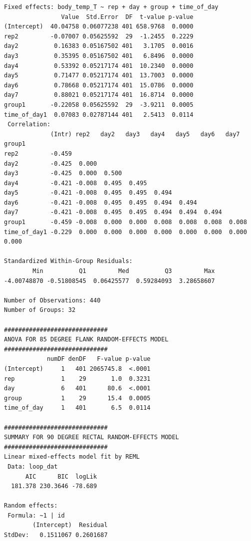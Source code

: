 \documentclass[a4paper, 10pt, titlepage]{article}
\begin{document}
\begin{lstlisting}[basicstyle = \footnotesize \ttfamily]
Fixed effects: body_temp_T ~ rep + day + group + time_of_day 
                Value  Std.Error  DF  t-value p-value
(Intercept)  40.04758 0.06077238 401 658.9768  0.0000
rep2         -0.07007 0.05625592  29  -1.2455  0.2229
day2          0.16383 0.05167502 401   3.1705  0.0016
day3          0.35395 0.05167502 401   6.8496  0.0000
day4          0.53392 0.05217174 401  10.2340  0.0000
day5          0.71477 0.05217174 401  13.7003  0.0000
day6          0.78668 0.05217174 401  15.0786  0.0000
day7          0.88021 0.05217174 401  16.8714  0.0000
group1       -0.22058 0.05625592  29  -3.9211  0.0005
time_of_day1  0.07083 0.02787144 401   2.5413  0.0114
 Correlation: 
             (Intr) rep2   day2   day3   day4   day5   day6   day7   group1
rep2         -0.459                                                        
day2         -0.425  0.000                                                 
day3         -0.425  0.000  0.500                                          
day4         -0.421 -0.008  0.495  0.495                                   
day5         -0.421 -0.008  0.495  0.495  0.494                            
day6         -0.421 -0.008  0.495  0.495  0.494  0.494                     
day7         -0.421 -0.008  0.495  0.495  0.494  0.494  0.494              
group1       -0.459 -0.008  0.000  0.000  0.008  0.008  0.008  0.008       
time_of_day1 -0.229  0.000  0.000  0.000  0.000  0.000  0.000  0.000  0.000

Standardized Within-Group Residuals:
        Min          Q1         Med          Q3         Max 
-4.00748870 -0.51808545  0.06425577  0.59284093  3.28658607 

Number of Observations: 440
Number of Groups: 32 

############################# 
ANOVA FOR 85 DEGREE FLANK RANDOM-EFFECTS MODEL 
#############################
            numDF denDF   F-value p-value
(Intercept)     1   401 2065745.8  <.0001
rep             1    29       1.0  0.3231
day             6   401      80.6  <.0001
group           1    29      15.4  0.0005
time_of_day     1   401       6.5  0.0114

############################# 
SUMMARY FOR 90 DEGREE RECTAL RANDOM-EFFECTS MODEL 
#############################
Linear mixed-effects model fit by REML
 Data: loop_dat 
      AIC      BIC  logLik
  181.378 230.3646 -78.689

Random effects:
 Formula: ~1 | id
        (Intercept)  Residual
StdDev:   0.1511067 0.2601687


\end{lstlisting}
\end{document}
